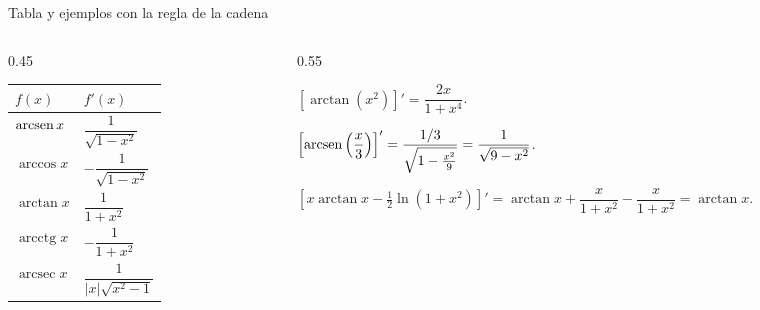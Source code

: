 \documentclass[10pt,aspectratio=169]{beamer}
\begin{document}
\begin{frame}{Tabla y ejemplos con la regla de la cadena}
  \begin{columns}
    \begin{column}{0.45\textwidth}
      \renewcommand{\arraystretch}{2.4}
      \begin{tabular}{|l|l|}
        \hline
        $f(x)$ & $f'(x)$\\ \hline
        $\operatorname{arcsen} x$ & $\dfrac{1}{\sqrt{1-x^2}}$\\
        $\arccos x$ & $-\dfrac{1}{\sqrt{1-x^2}}$\\
        $\arctan x$ & $\dfrac{1}{1+x^2}$\\
        $\operatorname{arcctg}x$ & $-\dfrac{1}{1+x^2}$\\
        $\operatorname{arcsec}x$ & $\dfrac{1}{|x|\sqrt{x^2-1}}$\\ \hline
      \end{tabular}
    \end{column}
    \begin{column}{0.55\textwidth}
      \begin{ejemplo}[4]
        $\left[\arctan(x^2)\right]'=\dfrac{2x}{1+x^4}$.
      \end{ejemplo}
      \begin{ejemplo}[5]
        $\left[\operatorname{arcsen}\left(\dfrac x3\right)\right]'=\dfrac{1/3}{\sqrt{1-\frac{x^2}9}}=\dfrac{1}{\sqrt{9-x^2}}$.
      \end{ejemplo}
      \begin{ejemplo}[6]
        $\left[x\arctan x-\tfrac12\ln(1+x^2)\right]'=\arctan x+\dfrac{x}{1+x^2}-\dfrac{x}{1+x^2}=\arctan x$.
      \end{ejemplo}
    \end{column}
  \end{columns}
\end{frame}
\end{document}
